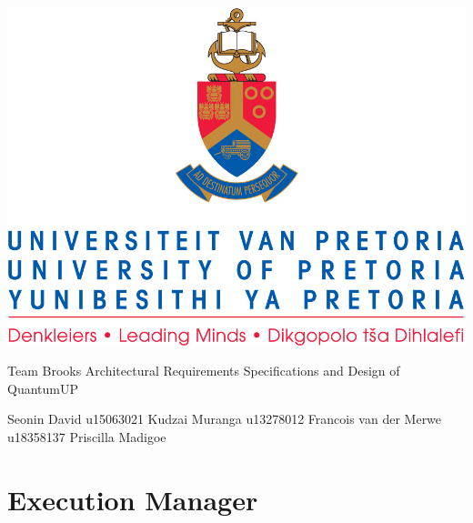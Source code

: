 \documentclass[]{article}
\begin{document}
\selectfont
	\begin{center}\thispagestyle{empty}
		\includegraphics{uplogo.jpg}
		
		{\Huge 
			Team Brooks \linebreak
			Architectural Requirements Specifications and Design of QuantumUP \linebreak 
			\par}
		 
        
        \begin{LARGE}
            Seonin David u15063021
            \linebreak
            \linebreak
            Kudzai Muranga u13278012
            \linebreak
            \linebreak
            Francois van der Merwe u18358137
            \linebreak
            \linebreak
            Priscilla Madigoe
            \linebreak
            \linebreak
           
        \end{LARGE}
    \end{center}
    
    \newpage
	\tableofcontents
	\newpage
	\clearpage
	
    \section{Execution Manager}
    
    \newpage
    
\end{document}
